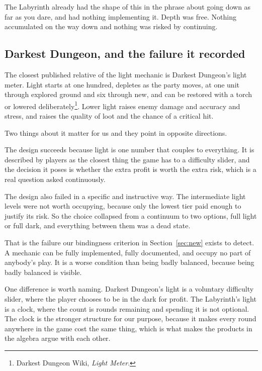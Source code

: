 \documentclass[11pt,a4paper]{article}
\begin{document}
The Labyrinth already had the shape of this in the phrase about going down as far as you dare,
and had nothing implementing it. Depth was free. Nothing accumulated on the way down and nothing
was risked by continuing.

\subsection{Darkest Dungeon, and the failure it recorded}

The closest published relative of the light mechanic is Darkest Dungeon's light meter. Light
starts at one hundred, depletes as the party moves, at one unit through explored ground and six
through new, and can be restored with a torch or lowered
deliberately\footnote{Darkest Dungeon Wiki, \emph{Light Meter}.}. Lower light raises enemy damage
and accuracy and stress, and raises the quality of loot and the chance of a critical hit.

Two things about it matter for us and they point in opposite directions.

The design succeeds because light is one number that couples to everything. It is described by
players as the closest thing the game has to a difficulty slider, and the decision it poses is
whether the extra profit is worth the extra risk, which is a real question asked continuously.

The design also failed in a specific and instructive way. The intermediate light levels were not
worth occupying, because only the lowest tier paid enough to justify its risk. So the choice
collapsed from a continuum to two options, full light or full dark, and everything between them
was a dead state.

\begin{alarmbox}
That is the failure our bindingness criterion in Section~\ref{sec:new} exists to detect. A
mechanic can be fully implemented, fully documented, and occupy no part of anybody's play. It is
a worse condition than being badly balanced, because being badly balanced is visible.
\end{alarmbox}

One difference is worth naming. Darkest Dungeon's light is a voluntary difficulty slider, where
the player chooses to be in the dark for profit. The Labyrinth's light is a clock, where the
count is rounds remaining and spending it is not optional. The clock is the stronger structure
for our purpose, because it makes every round anywhere in the game cost the same thing, which is
what makes the products in the algebra argue with each other.
\end{document}
